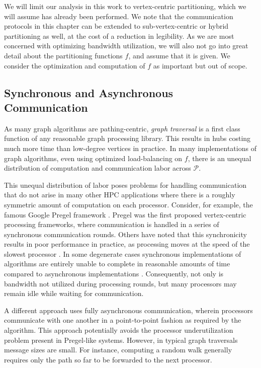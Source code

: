 \documentclass{report}
\begin{document}
We will limit our analysis in this work to vertex-centric partitioning, which we will assume has already been performed. 
We note that the communication protocols in this chapter can be extended to sub-vertex-centric or hybrid partitioning as well, at the cost of a reduction in legibility. 
As we are most concerned with optimizing bandwidth utilization, we will also not go into great detail about the partitioning functions $f$, and assume that it is given.
We consider the optimization and computation of $f$ as important but out of scope. 


\subsection{Synchronous and Asynchronous Communication} \label{async:sec:intro:communication}


As many graph algorithms are pathing-centric, \emph{graph traversal} is a first class function of any reasonable graph processing library.
This results in hubs costing much more time than low-degree vertices in practice.
In many implementations of graph algorithms, even using optimized load-balancing on $f$, there is an unequal distribution of computation and communication labor across $\mathcal{P}$.

This unequal distribution of labor poses problems for handling communication that do not arise in many other HPC applications where there is a roughly symmetric amount of computation on each processor. 
Consider, for example, the famous Google Pregel framework \cite{malewicz2010pregel}.
Pregel was the first proposed vertex-centric processing frameworks, where communication is handled in a series of synchronous communication rounds.
Others have noted that this synchronicity results in poor performance in practice, as processing moves at the speed of the slowest processor \cite{pearce2014faster, junghanns2017management}.
In some degenerate cases synchronous implementations of algorithms are entirely unable to complete in reasonable amounts of time compared to asynchronous implementations \cite{junghanns2017management}.
Consequently, not only is bandwidth not utilized during processing rounds, but many processors may remain idle while waiting for communication.

A different approach uses fully asynchronous communication, wherein processors communicate with one another in a point-to-point fashion as required by the algorithm.
This approach potentially avoids the processor underutilization problem present in Pregel-like systems.
However, in typical graph traversals message sizes are small.
For instance, computing a random walk generally requires only the path so far to be forwarded to the next processor.
\end{document}

